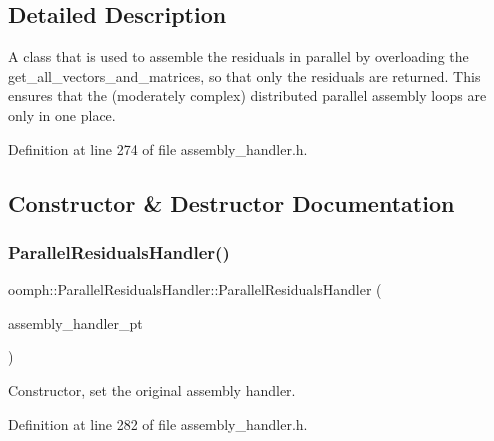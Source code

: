 \subsection{Detailed Description}
A class that is used to assemble the residuals in parallel by overloading the get\+\_\+all\+\_\+vectors\+\_\+and\+\_\+matrices, so that only the residuals are returned. This ensures that the (moderately complex) distributed parallel assembly loops are only in one place. 

Definition at line 274 of file assembly\+\_\+handler.\+h.



\subsection{Constructor \& Destructor Documentation}
\mbox{\label{classoomph_1_1ParallelResidualsHandler_a900d86e1f8e9f4fa9369b0afec456b22}} 
\subsubsection{\texorpdfstring{Parallel\+Residuals\+Handler()}{ParallelResidualsHandler()}}
{\footnotesize\ttfamily oomph\+::\+Parallel\+Residuals\+Handler\+::\+Parallel\+Residuals\+Handler (\begin{DoxyParamCaption}\item[{\hyperlink{classoomph_1_1AssemblyHandler}{Assembly\+Handler} $\ast$const \&}]{assembly\+\_\+handler\+\_\+pt }\end{DoxyParamCaption})\hspace{0.3cm}{\ttfamily [inline]}}



Constructor, set the original assembly handler. 



Definition at line 282 of file assembly\+\_\+handler.\+h.

\mbox{\label{classoomph_1_1ParallelResidualsHandler_abe905bb4dfc8977da144e8796f65ebf4}} 
